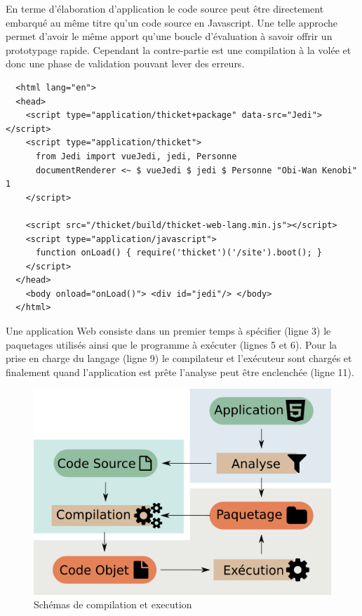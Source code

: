\documentclass[twoside,a4paper]{article}
\begin{document}
En  terme  d'élaboration  d'application   le  code  source  peut  être
directement   embarqué   au   même   titre  qu'un   code   source   en
Javascript. Une  telle approche permet  d'avoir le même  apport qu'une
boucle d'évaluation  à savoir offrir un  prototypage rapide. Cependant
la contre-partie est  une compilation à la volée et  donc une phase de
validation pouvant lever des erreurs.

\lstset{language=Html}
\begin{lstlisting}
  <html lang="en">
  <head>
    <script type="application/thicket+package" data-src="Jedi"></script>
    <script type="application/thicket">
      from Jedi import vueJedi, jedi, Personne
      documentRenderer <~ $ vueJedi $ jedi $ Personne "Obi-Wan Kenobi" 1
    </script>

    <script src="/thicket/build/thicket-web-lang.min.js"></script>    
    <script type="application/javascript">
      function onLoad() { require('thicket')('/site').boot(); }
    </script>
  </head>        
    <body onload="onLoad()"> <div id="jedi"/> </body>
  </html>
\end{lstlisting}

Une application Web consiste dans  un premier temps à spécifier (ligne
3) le paquetages utilisés ainsi que  le programme à exécuter (lignes 5
et 6).  Pour la prise en charge du langage (ligne 9) le compilateur et
l'exécuteur sont  chargés et finalement quand  l'application est prête
l'analyse peut être enclenchée (ligne 11).

\begin{figure}[h]
\centering
\includegraphics[scale=0.45]{repl} 
\caption{Schémas de compilation et execution}
\label{repl}
\end{figure}
\end{document}
